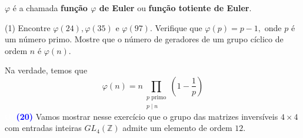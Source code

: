 \documentclass[12pt, a4paper]{article}
\newcommand{\negrito}[1]{\mbox{\boldmath{$#1$}}}
\begin{document}
$\varphi$ é a chamada \textbf{função $\varphi$ de Euler} ou \textbf{função totiente de Euler}.
\begin{tasks}[counter-format={(tsk[a])},label-width=3.6ex, label-format = {\bfseries}, column-sep = {0pt}](1)
\task[\textcolor{Floresta}{$\negrito{(a)} $}] Encontre $\varphi(24),\varphi(35)$ e $\varphi(97).$
\task[\textcolor{Floresta}{$\negrito{(b)} $}] Verifique que $\varphi(p) = p-1,$ onde $p$ é um número primo.
\task[\textcolor{Floresta}{$\negrito{(c)} $}]  Mostre que o número de geradores de um grupo cíclico de ordem $n$ é $\varphi(n).$
\end{tasks}
Na verdade, temos que 
\[
\varphi(n) = n \prod\limits_{\substack{p \mbox{ primo} \\ p \mid n }} \left(1 - \frac{1}{p} \right) 
\]
\textcolor{white}{Oi}\newline\newline
\textcolor{blue}{\bf(20)}\label{27} Vamos mostrar nesse exercício que o grupo das matrizes inversíveis $4 \times 4$ com entradas inteiras $GL_4(\mathbb{Z})$ admite um elemento de ordem $12.$%
\end{document}
